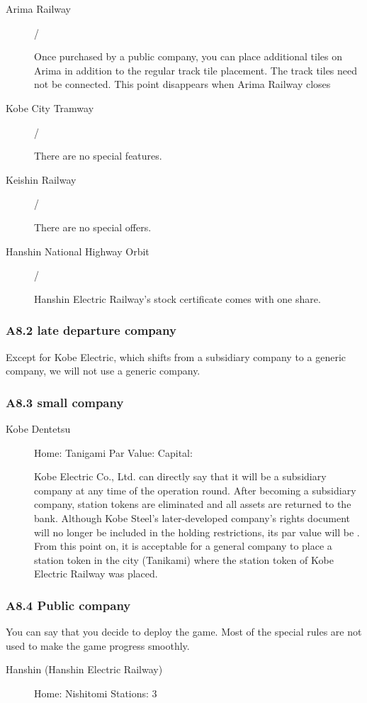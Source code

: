 \documentclass{article}
\begin{document}
\begin{CJK}{UTF8}{min}
\begin{description}
\item[Arima Railway]  / 

Once purchased by a public company, you can
place additional tiles on Arima in addition to the regular track tile
placement. The track tiles need not be connected. This point
disappears when Arima Railway closes

\item[Kobe City Tramway]  / 

There are no special features.

\item[Keishin Railway]   / 

There are no special offers.

\item[Hanshin National Highway Orbit]  / 

Hanshin Electric Railway's stock certificate comes with one share.
\end{description}

\subsubsection*{A8.2 late departure company}

Except for Kobe Electric, which shifts from a subsidiary company to a
generic company, we will not use a generic company.

\subsubsection*{A8.3 small company}
\begin{description}
\item[Kobe Dentetsu] Home: Tanigami Par Value:  Capital: 

Kobe Electric Co., Ltd. can directly say that it will be a subsidiary
company at any time of the operation round. After becoming a
subsidiary company, station tokens are eliminated and all assets are
returned to the bank. Although Kobe Steel's later-developed company's
rights document will no longer be included in the holding
restrictions, its par value will be . From this point on, it is
acceptable for a general company to place a station token in the city
(Tanikami) where the station token of Kobe Electric Railway was
placed.
\end{description}

\subsubsection*{A8.4 Public company}
You can say that you decide to deploy the game. Most of the special
rules are not used to make the game progress smoothly.
\begin{description}
\item[Hanshin (Hanshin Electric Railway)] Home: Nishitomi Stations: 3


\end{description}
\end{CJK}
\end{document}
